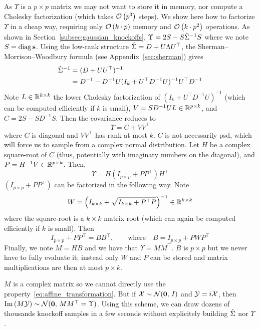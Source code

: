 \bigbreak
As $\Upsilon$ is a $p \times p$ matrix we may not want to store it in memory,
nor compute a Cholesky factorization (which takes $\mathcal{O}\left( p^3 \right)$ steps).
We show here how to factorize $\Upsilon$ in a cheap way,
requiring only $\mathcal{O}\left( k \cdot p \right)$ memory and $\mathcal{O}\left( k\cdot p^2 \right)$ operations.
As shown in Section~\ref{subsec:gaussian_knockoffs}, $\Upsilon = 2S - S\hat{\Sigma}^{-1}S$ where we note $S = \operatorname*{diag}\mathbf{s}$.
Using the low-rank structure $\hat{\Sigma} = D + U\Lambda U^\top$,
the Sherman–Morrison–Woodbury formula (see Appendix~\ref{sec:sherman}) gives
\begin{align*}
    \hat{\Sigma}^{-1} &= (D + UU^\top)^{-1}\\
    &= D^{-1} - D^{-1}U(I_k + U^\top D^{-1}U)^{-1}U^\top D^{-1}
\end{align*}
Note $L \in \mathbb{R}^{k \times k}$ the lower Cholesky factorization of
$(I_k + U^\top D^{-1}U)^{-1}$ (which can be computed efficiently if $k$ is small),
$V = SD^{-1}UL \in \mathbb{R}^{p \times k}$,
and $C = 2S - SD^{-1}S$.
Then the covariance reduces to
\begin{equation*}
    \Upsilon = C + VV^\top
\end{equation*}
where $C$ is diagonal and $VV^\top$ has rank at most $k$.
$C$ is not necessarily psd, which will force us to sample from a complex normal distribution.
Let $H$ be a complex square-root of $C$ (thus, potentially with imaginary numbers on the diagonal),
and $P = H^{-1}V \in \mathbb{R}^{p \times k}$.
Then,
\begin{equation*}
    \Upsilon = H \left( I_{p \times p} + PP^\top \right) H^\top
\end{equation*}
$\left( I_{p \times p} + PP^\top \right)$ can be factorized in the following way.
Note
\begin{equation*}
    W = \left(I_{k \times k} + \sqrt{I_{k \times k} + P^\top P}\right)^{-1} \in \mathbb{R}^{k \times k}
\end{equation*}
where the square-root is a $k \times k$ matrix root (which can again be computed efficiently if $k$ is small).
Then
\begin{equation*}
    I_{p \times p} + PP^\top = BB^\top
    ,\qquad
    \text{where}
    \quad
    B = I_{p \times p} + PWP^\top
\end{equation*}
Finally, we note $M = HB$ and we have that $\Upsilon = MM^\top$.
$B$ is $p \times p$ but we never have to fully evaluate it;
instead only $W$ and $P$ can be stored and matrix multiplications are then at most $p \times k$.

$M$ is a complex matrix so we cannot directly use the property~\ref{eq:affine_transformation}.
But if $\mathcal{X} \sim \mathcal{N}(\mathbf{0},\, I)$ and $\mathcal{Y} = i\mathcal{X}$,
then $\operatorname{Im}\left( M\mathcal{Y} \right) \sim \mathcal{N}(\mathbf{0},\, MM^\top = \Upsilon)$.
Using this scheme, we can draw dozens of thousands knockoff samples in a few seconds without explicitely
building $\hat{\Sigma}$ nor $\Upsilon$.

